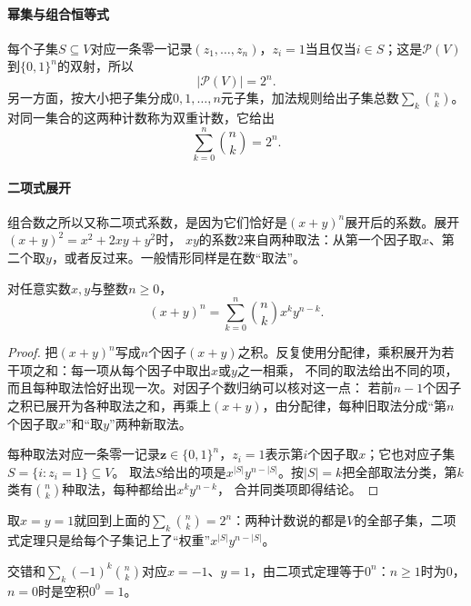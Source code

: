 \paragraph{幂集与组合恒等式}
\label{sec:comb-ordered-unordered}
每个子集$S\subseteq V$对应一条零一记录$(z_1,\ldots,z_n)$，$z_i=1$当且仅当$i\in S$；这是$\mathcal P(V)$到$\{0,1\}^n$的双射，所以
\begin{equation}
 |\mathcal P(V)|=2^n.
 \label{eq:comb-power-set-count}
\end{equation}
另一方面，按大小把子集分成$0,1,\ldots,n$元子集，加法规则给出子集总数$\sum_k\binom nk$。对同一集合的这两种计数称为双重计数，它给出
\begin{equation}
 \sum_{k=0}^n\binom nk=2^n.
 \label{eq:comb-binomial-sum}
\end{equation}

\paragraph{二项式展开}
组合数之所以又称二项式系数，是因为它们恰好是$(x+y)^n$展开后的系数。展开$(x+y)^2=x^2+2xy+y^2$时，
$xy$的系数$2$来自两种取法：从第一个因子取$x$、第二个取$y$，或者反过来。一般情形同样是在数“取法”。
\begin{theorem}[二项式定理]
\label{thm:comb-binomial-theorem}
对任意实数$x,y$与整数$n\geq0$，
\begin{equation}
 (x+y)^n=\sum_{k=0}^n\binom nk x^ky^{n-k}.
 \label{eq:comb-binomial-theorem}
\end{equation}
\end{theorem}
\begin{proof}
把$(x+y)^n$写成$n$个因子$(x+y)$之积。反复使用分配律，乘积展开为若干项之和：每一项从每个因子中取出$x$或$y$之一相乘，
不同的取法给出不同的项，而且每种取法恰好出现一次。对因子个数归纳可以核对这一点：
若前$n-1$个因子之积已展开为各种取法之和，再乘上$(x+y)$，由分配律，每种旧取法分成“第$n$个因子取$x$”和“取$y$”两种新取法。

每种取法对应一条零一记录$\bm z\in\{0,1\}^n$，$z_i=1$表示第$i$个因子取$x$；它也对应子集$S=\{i:z_i=1\}\subseteq V$。
取法$S$给出的项是$x^{|S|}y^{n-|S|}$。按$|S|=k$把全部取法分类，第$k$类有$\binom nk$种取法，每种都给出$x^ky^{n-k}$，
合并同类项即得结论。
\end{proof}
取$x=y=1$就回到上面的$\sum_k\binom nk=2^n$：两种计数说的都是$V$的全部子集，二项式定理只是给每个子集记上了“权重”$x^{|S|}y^{n-|S|}$。

交错和$\sum_k(-1)^k\binom nk$对应$x=-1$、$y=1$，由二项式定理等于$0^n$：$n\geq1$时为$0$，$n=0$时是空积$0^0=1$。

